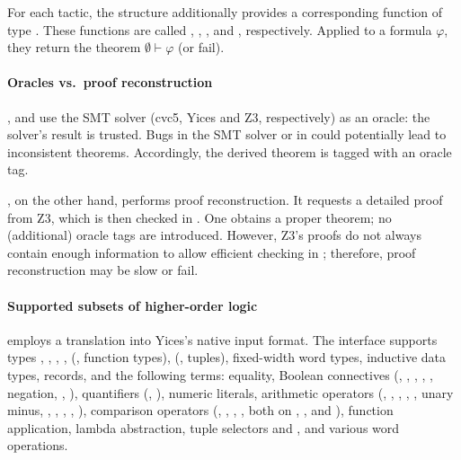 For each tactic, the  structure additionally provides a
corresponding function of type .  These functions are
called , ,
, and , respectively.  Applied to
a formula $\varphi$, they return the theorem $\emptyset \vdash
\varphi$ (or fail).

\paragraph{Oracles vs.\ proof reconstruction}

,  and  use
the SMT solver (cvc5, Yices and Z3, respectively) as an oracle: the
solver's result is trusted.  Bugs in the SMT solver or in
 could potentially lead to inconsistent theorems.
Accordingly, the derived theorem is tagged with an oracle tag.

, on the other hand, performs proof reconstruction.  It
requests a detailed proof from Z3, which is then checked in \HOL{}.
One obtains a proper \HOL{} theorem; no (additional) oracle tags are
introduced. However, Z3's proofs do not always contain enough
information to allow efficient checking in \HOL{}; therefore, proof
reconstruction may be slow or fail.

\paragraph{Supported subsets of higher-order logic}

 employs a translation into Yices's native input
format.  The interface supports types , ,
, , \holtxt{->} (\ie, function types),
 (\ie, tuples), fixed-width word types, inductive data
types, records, and the following terms: equality, Boolean connectives
(, , \holtxt{==>}, \holtxt{/\bs}, \holtxt{\bs /},
negation, , ), quantifiers
(\holtxt{!}, ), numeric literals, arithmetic operators
(, \holtxt{+}, \holtxt{-}, \holtxt{*}, \holtxt{/}, unary
minus, , , , ,
), comparison operators (\holtxt{<}, \holtxt{<=},
\holtxt{>}, \holtxt{>=}, both on , , and
), function application, lambda abstraction, tuple
selectors  and , and various word operations.

